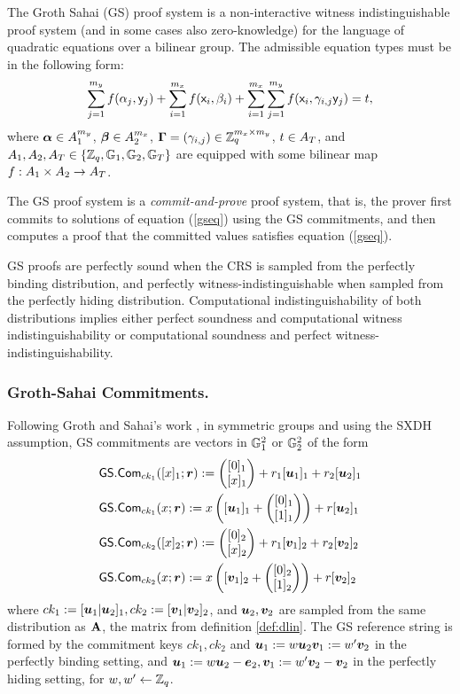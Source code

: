 
The Groth Sahai (GS) proof system is a non-interactive witness indistinguishable proof system (and in some cases also zero-knowledge) for the language of quadratic equations over a bilinear group. The admissible equation types must be in the following form:
\begin{equation}\label{gseq}
\sum_{j=1}^{m_y} f(\alpha_j, \mathsf{y}_j)+\sum_{i=1}^{m_x} f(\mathsf{x}_i, \beta_i)+\sum_{i=1}^{m_x} \sum_{j=1}^{m_y}  f(\mathsf{x}_i,\gamma_{i,j} \mathsf{y}_j)=t,
\end{equation}
 where $\boldsymbol \alpha  \in A_1^{m_y}$, $\boldsymbol \beta  \in A_2^{m_x}$, $\mathbf{{\Gamma}}=(\gamma_{i,j}) \in \mathbb{Z}_q^{m_x\times m_y}$, $t \in A_T$, and $A_1,A_2,A_T\in\{\mathbb{Z}_q,\mathbb{G}_1,\mathbb{G}_2, \mathbb{G}_T\}$ 
are equipped with some bilinear map $f:A_1\times A_2 \rightarrow A_T$.

The GS proof system is a \emph{commit-and-prove} proof system, that is, the prover first commits to solutions
of equation (\ref{gseq}) using the GS commitments, and then computes a proof that the committed values satisfies equation (\ref{gseq}).

GS proofs are perfectly sound when the CRS is sampled from the perfectly binding distribution, and perfectly witness-indistinguishable when sampled from the perfectly hiding distribution. Computational indistinguishability of  both distributions implies either perfect soundness and computational witness indistinguishability or computational soundness and perfect witness-indistinguishability.

\subsubsection{Groth-Sahai Commitments.}
Following Groth and Sahai's work \cite{EC:GroSah08}, in symmetric groups and using the SXDH assumption, GS commitments are vectors in $\mathbb{G}^2_1$ or $\mathbb{G}_2^2$ of the form
\begin{align*}
&{\mathsf{GS}}.\mathsf{Com}_{ck_1}([x]_1;{\boldsymbol{r}}):=\left(\begin{matrix}{[0]_1}\\{[x]_1}\end{matrix}\right)+r_1[{\boldsymbol{u}}_1]_1+{r}_2[{\boldsymbol{u}}_2]_1\\
&{\mathsf{GS}}.\mathsf{Com}_{ck_1}(x;{\boldsymbol{r}}):=x\left([{\boldsymbol{u}}_1]_1+\left(\begin{matrix}{[0]_1}\\{[1]_1}\end{matrix}\right)\right)+{r}[{\boldsymbol{u}}_2]_1\\
& {\mathsf{GS}}.\mathsf{Com}_{ck_2}([x]_2;{\boldsymbol{r}}):=\left(\begin{matrix}{[0]_2}\\{[x]_2}\end{matrix}\right)+r_1[{\boldsymbol{v}}_1]_2+{r}_2[{\boldsymbol{v}}_2]_2\\
&{\mathsf{GS}}.\mathsf{Com}_{ck_2}(x;{\boldsymbol{r}}):=x\left([{\boldsymbol{v}}_1]_2+\left(\begin{matrix}{[0]_2}\\{[1]_2}\end{matrix}\right)\right)+{r}[{\boldsymbol{v}}_2]_2
\end{align*}
where $ck_1:=[{\boldsymbol{u}}_1|{\boldsymbol{u}}_2]_1,ck_2:=[{\boldsymbol{v}}_1|{\boldsymbol{v}}_2]_2$, and ${\boldsymbol{u}}_2,{\boldsymbol{v}}_2$ are sampled from the same distribution as $\mathbf{{A}}$, the matrix from definition \ref{def:dlin}. The GS reference string is formed by the commitment keys $ck_1,ck_2$  and ${\boldsymbol{u}}_1:=w{\boldsymbol{u}}_2{\boldsymbol{v}}_1:=w'{\boldsymbol{v}}_2$ in the perfectly binding setting, and ${\boldsymbol{u}}_1:=w{\boldsymbol{u}}_2-{\boldsymbol{e}}_2,{\boldsymbol{v}}_1:=w'{\boldsymbol{v}}_2-{\boldsymbol{v}}_2$ in the perfectly hiding setting, for $w,w'\gets\mathbb{Z}_q$.
